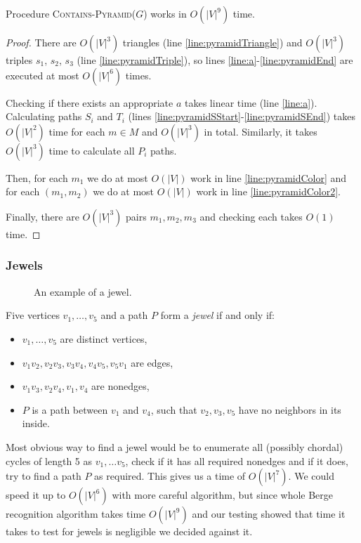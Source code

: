 \begin{theorem}
	Procedure \textsc{Contains-Pyramid($G$)} works in $O(|V|^9)$ time.
\end{theorem}
\begin{proof}
	There are $O(|V|^3)$ triangles (line \ref{line:pyramidTriangle}) and $O(|V|^3)$ triples $s_1$, $s_2$, $s_3$ (line \ref{line:pyramidTriple}), so lines \ref{line:a}-\ref{line:pyramidEnd} are executed at most $O(|V|^6)$ times.

	Checking if there exists an appropriate $a$ takes linear time (line \ref{line:a}). Calculating paths $S_i$ and $T_i$ (lines \ref{line:pyramidSStart}-\ref{line:pyramidSEnd}) takes $O(|V|^2)$ time for each $m \in M$ and $O(|V|^3)$ in total. Similarly, it takes $O(|V|^3)$ time to calculate all $P_i$ paths.

	Then, for each $m_1$ we do at most $O(|V|)$ work in line \ref{line:pyramidColor} and for each $(m_1, m_2)$ we do at most $O(|V|)$ work in line \ref{line:pyramidColor2}.

	Finally, there are $O(|V|^3)$ pairs $m_1, m_2, m_3$ and checking each takes $O(1)$ time.
\end{proof}

\subsubsection{Jewels}

\begin{wrapfigure}{r}{0.35\textwidth}
	
	\caption{An example of a jewel.}
	\vspace{-1.8cm}
\end{wrapfigure}


Five vertices $v_1, \ldots, v_5$ and a path $P$ form a \emph{jewel} if and only if:

\begin{itemize}
	\item $v_1, \ldots, v_5$ are distinct vertices,
	\item $v_1v_2, v_2v_3, v_3v_4, v_4v_5, v_5v_1$ are edges,
	\item $v_1v_3, v_2v_4, v_1,v_4$ are nonedges,
	\item $P$ is a path between $v_1$ and $v_4$, such that $v_2, v_3, v_5$ have no neighbors in its inside.
\end{itemize}

Most obvious way to find a jewel would be to enumerate all (possibly chordal) cycles of length 5 as $v_1, \ldots v_5$, check if it has all required nonedges and if it does, try to find a path $P$ as required. This gives us a time of $O(|V|^7)$. We could speed it up to $O(|V|^6)$ with more careful algorithm, but since whole Berge recognition algorithm takes time $O(|V|^9)$ and our testing showed that time it takes to test for jewels is negligible we decided against it.

